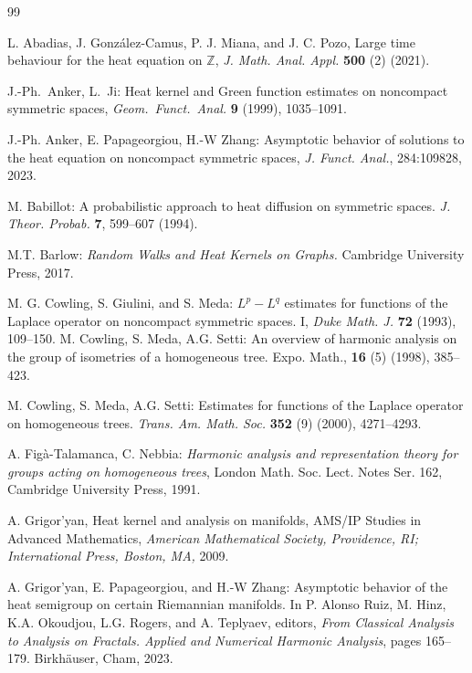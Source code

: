 \documentclass[11pt,a4paper,reqno]{amsart}
\theoremstyle{plain}
\theoremstyle{remark}
\theoremstyle{definition}
\theoremstyle{remark}
\numberwithin{equation}{section}
\begin{document}
	

	\begin{thebibliography}{99}
		
         L. Abadias, J. González-Camus, P. J. Miana, and J. C. Pozo, Large time behaviour for the heat equation on $\mathbb{Z}$, \textit{J. Math. Anal. Appl.} \textbf{500} (2) (2021). 
        
         J.-Ph.\ Anker, L.\ Ji: Heat kernel and Green function estimates on noncompact symmetric spaces, \textit{Geom.\ Funct.\ Anal.} \textbf{9} (1999), 1035--1091.

         J.-Ph. Anker, E. Papageorgiou, H.-W Zhang: Asymptotic behavior of solutions to the heat equation on noncompact symmetric spaces, \textit{J. Funct. Anal.}, 284:109828, 2023.

         M. Babillot: A probabilistic approach to heat diffusion on symmetric spaces. \textit{J. Theor. Probab.} \textbf{7}, 599–607 (1994).

         M.T. Barlow: \textit{Random Walks and Heat Kernels on Graphs.} Cambridge University Press, 2017.

         M. G. Cowling, S. Giulini, and S. Meda: $L^p - L^q$ estimates for functions of the Laplace operator on noncompact symmetric spaces. I, \textit{Duke Math. J.} \textbf{72} (1993), 109--150.
         M. Cowling, S. Meda, A.G. Setti: An overview of harmonic analysis on the group of isometries of a homogeneous tree. Expo. Math., \textbf{16} (5) (1998), 385--423.
		
		 M. Cowling, S. Meda, A.G. Setti: Estimates for functions of the Laplace operator on homogeneous trees. \textit{Trans. Am. Math. Soc.} \textbf{352} (9) (2000), 4271--4293. 
        
		
		 A. Fig{\`a}-Talamanca, C. Nebbia: \textit{Harmonic analysis and representation theory for groups acting on homogeneous trees}, London Math. Soc. Lect. Notes Ser. 162, Cambridge University Press, 1991.

         A. Grigor’yan, Heat kernel and analysis on manifolds, AMS/IP Studies in Advanced
    Mathematics, \textit{American Mathematical Society, Providence, RI; International Press, Boston, MA,} 2009.

         A. Grigor’yan, E. Papageorgiou, and H.-W Zhang: Asymptotic behavior of the heat semigroup on certain Riemannian manifolds.
        In P. Alonso Ruiz, M. Hinz, K.A. Okoudjou, L.G. Rogers, and A. Teplyaev, editors, \textit{From Classical Analysis to Analysis on Fractals. Applied and Numerical Harmonic Analysis}, pages 165--179. Birkhäuser, Cham, 2023.
		

\end{thebibliography}
\end{document}
